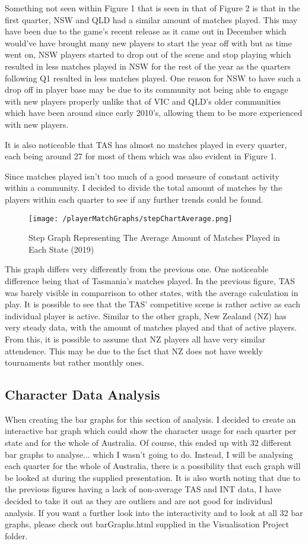 \documentclass[11pt, oneside, a4paper]{article}
\begin{document}
Something not seen within Figure 1 that is seen in that of Figure 2 is that in the first quarter, NSW and QLD had a similar amount of matches played. This may have been due to the game's recent release as it came out in December which would've have brought many new players to start the year off with but as time went on, NSW players started to drop out of the scene and stop playing which resulted in less matches played in NSW for the rest of the year as the quarters following Q1 resulted in less matches played. One reason for NSW to have such a drop off in player base may be due to its community not being able to engage with new players properly unlike that of VIC and QLD's older communities which have been around since early 2010's, allowing them to be more experienced with new players.

It is also noticeable that TAS has almost no matches played in every quarter, each being around 27 for most of them which was also evident in Figure 1.

Since matches played isn't too much of a good measure of constant activity within a community. I decided to divide the total amount of matches by the players within each quarter to see if any further trends could be found.

\newpage
\begin{figure}[!ht]
	\centerline{\texttt{[image: /playerMatchGraphs/stepChartAverage.png]}}
	\caption{Step Graph Representing The Average Amount of Matches Played in Each State (2019)}
	\label{fig:figure2}
\end{figure}

This graph differs very differently from the previous one. One noticeable difference being that of Tasmania's matches played. In the previous figure, TAS was barely visible in comparrison to other states, with the average calculation in play. It is possible to see that the TAS' competitive scene is rather active as each individual player is active. Similar to the other graph, New Zealand (NZ) has very steady data, with the amount of matches played and that of active players. From this, it is possible to assume that NZ players all have very similar attendence. This may be due to the fact that NZ does not have weekly tournaments but rather monthly ones.
\newpage
\subsection{Character Data Analysis}
When creating the bar graphs for this section of analysis. I decided to create an interactive bar graph which could show the character usage for each quarter per state and for the whole of Australia. Of course, this ended up with 32 different bar graphs to analyse... which I wasn't going to do. Instead, I will be analysing each quarter for the whole of Australia, there is a possibility that each graph will be looked at during the supplied presentation. It is also worth noting that due to the previous figures having a lack of non-average TAS and INT data, I have decided to take it out as they are outliers and are not good for individual analysis. If you want a further look into the interactivity and to look at all 32 bar graphs, please check out barGraphs.html supplied in the Visualisation Project folder.
\end{document}
